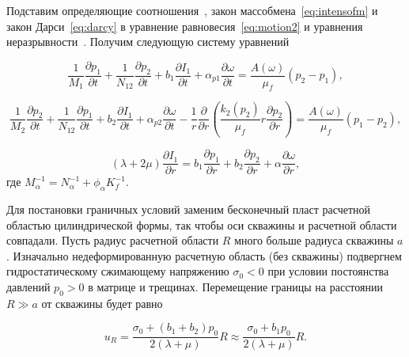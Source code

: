 Подставим определяющие соотношения~, закон массобмена~\eqref{eq:intensofm} и закон Дарси~\eqref{eq:darcy} в уравнение равновесия~\eqref{eq:motion2} и уравнения неразрывности~. Получим следующую систему уравнений

\begin{equation}
  \label{eq:sys1}
  \frac{1}{{{M_1}}}\frac{{\partial {p_1}}}{{\partial t}} + \frac{1}{{{N_{12}}}}\frac{{\partial {p_2}}}{{\partial t}} + {b_1}\frac{{\partial {I_1}}}{{\partial t}} + {\alpha _{p1}}\frac{{\partial \omega }}{{\partial t}} = \frac{{A(\omega )}}{{{\mu _f}}}({p_2} - {p_1}),
\end{equation}

\begin{equation}
  \label{eq:sys2}
  \frac{1}{{{M_2}}}\frac{{\partial {p_2}}}{{\partial t}} + \frac{1}{{{N_{12}}}}\frac{{\partial {p_1}}}{{\partial t}} + {b_2}\frac{{\partial {I_1}}}{{\partial t}} + {\alpha _{p2}}\frac{{\partial \omega }}{{\partial t}} - \frac{1}{r}\frac{\partial }{{\partial r}}\left( {\frac{{{k_2}({p_2})}}{{{\mu _f}}}r\frac{{\partial {p_2}}}{{\partial r}}} \right) = \frac{{A(\omega )}}{{{\mu _f}}}({p_1} - {p_2}),
\end{equation}

\begin{equation}
  \label{eq:sys3}
  (\lambda  + 2\mu )\frac{{\partial {I_1}}}{{\partial r}} = {b_1}\frac{{\partial {p_1}}}{{\partial r}} + {b_2}\frac{{\partial {p_2}}}{{\partial r}} + \alpha \frac{{\partial \omega }}{{\partial r}},
\end{equation}
где $M_\alpha ^{ - 1} = N_\alpha ^{ - 1} + \phi _\alpha ^{}K_f^{ - 1}$.

Для постановки граничных условий заменим бесконечный пласт расчетной областью цилиндрической формы, так чтобы оси скважины и расчетной области совпадали. Пусть радиус расчетной области $R$ много больше радиуса скважины $a$. Изначально недеформированную расчетную область (без скважины) подвергнем гидростатическому сжимающему напряжению  $\sigma_0 < 0$ при условии постоянства давлений $p_0 > 0$ в матрице и трещинах. Перемещение границы на расстоянии  $R \gg a$ от скважины будет равно

\begin{equation}
  \label{eq:biasR}
  {u_R} = \frac{{\sigma _0^{} + ({b_1} + {b_2})p_0^{}}}{{2(\lambda  + \mu )}}R \approx \frac{{\sigma _0^{} + {b_1}p_0^{}}}{{2(\lambda  + \mu )}}R.
\end{equation}


